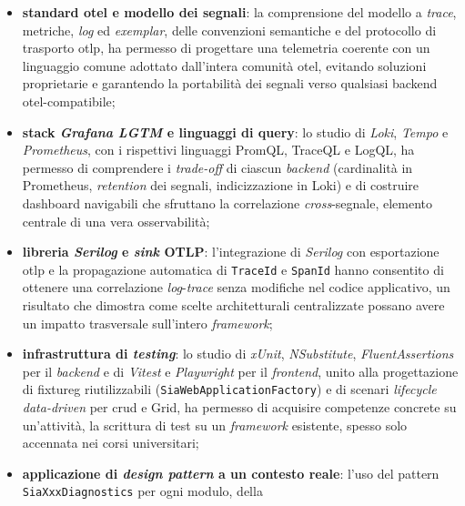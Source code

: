 \begin{itemize}
      \item \textbf{standard \gls{otel} e modello dei segnali}: la comprensione
            del modello a \emph{trace}, metriche, \emph{log} ed \emph{exemplar},
            delle convenzioni semantiche e del
            protocollo di trasporto \gls{otlp}, ha permesso di progettare una telemetria
            coerente con un linguaggio comune adottato dall'intera comunità \gls{otel},
            evitando soluzioni proprietarie e garantendo la portabilità dei segnali
            verso qualsiasi backend \gls{otel}-compatibile;
      \item \textbf{stack \emph{Grafana LGTM} e linguaggi di query}: lo studio di
            \emph{Loki}, \emph{Tempo} e \emph{Prometheus}, con i rispettivi
            linguaggi PromQL, TraceQL e LogQL, ha permesso di comprendere i
            \emph{trade-off} di ciascun \emph{backend} (cardinalità in Prometheus,
            \emph{retention} dei segnali, indicizzazione in Loki) e di costruire
            dashboard navigabili che sfruttano la correlazione \emph{cross}-segnale,
            elemento centrale di una vera osservabilità;
      \item \textbf{libreria \emph{Serilog} e \emph{sink} OTLP}: l'integrazione
            di \emph{Serilog} con esportazione \gls{otlp} e la propagazione automatica di
            \texttt{TraceId} e \texttt{SpanId} hanno consentito di ottenere una
            correlazione \emph{log}-\emph{trace} senza modifiche nel codice
            applicativo, un risultato che dimostra come scelte architetturali
            centralizzate possano avere un impatto trasversale sull'intero
            \emph{framework};
      \item \textbf{infrastruttura di \emph{testing}}: lo studio di \emph{xUnit},
            \emph{NSubstitute}, \emph{FluentAssertions} per il \emph{backend} e di
            \emph{Vitest} e \emph{Playwright} per il \emph{frontend}, unito alla
            progettazione di \gls{fixtureg} riutilizzabili
            (\texttt{SiaWebApplicationFactory}) e di scenari \emph{lifecycle}
            \emph{data-driven} per \gls{crud} e Grid, ha permesso di acquisire
            competenze concrete su un'attività, la scrittura di test su un
            \emph{framework} esistente, spesso solo accennata nei corsi
            universitari;
      \item \textbf{applicazione di \emph{design pattern} a un contesto reale}:
            l'uso del pattern \texttt{SiaXxxDiagnostics} per ogni modulo, della

\end{itemize}
